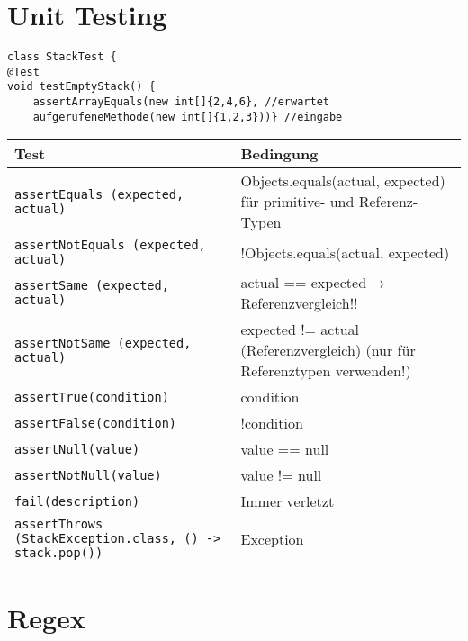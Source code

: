 \begin{multicols*}{5}
\section{Unit Testing}
\begin{lstlisting}
class StackTest {
@Test 
void testEmptyStack() {
	assertArrayEquals(new int[]{2,4,6}, //erwartet
	aufgerufeneMethode(new int[]{1,2,3}))} //eingabe
	\end{lstlisting}
	\begin{tabular}{|p{2cm} p{2.65cm}|}
		\hline
		Test&Bedingung\\
		\hline
		\hline
		\tiny\texttt{assertEquals (expected, actual)}&\footnotesize Objects.equals(actual, expected) für primitive- und Referenz-Typen\\
		\hline
		\tiny\texttt{assertNotEquals (expected, actual)}&\footnotesize !Objects.equals(actual, expected)\\
		\hline
		\tiny\texttt{assertSame (expected, actual)}&\footnotesize actual == expected\newline $\rightarrow$ Referenzvergleich!!\\
		\hline
		\tiny\texttt{assertNotSame (expected, actual)}&\footnotesize expected != actual (Referenzvergleich) (nur für Referenztypen verwenden!)\\
		\hline
		\tiny\texttt{assertTrue(condition)}&\footnotesize condition\\
		\hline
		\tiny\texttt{assertFalse(condition)}&\footnotesize !condition\\
		\hline
		\tiny\texttt{assertNull(value)}&\footnotesize value == null\\
		\hline
		\tiny\texttt{assertNotNull(value)}&\footnotesize value != null\\
		\hline
		\tiny\texttt{fail(description)}&\footnotesize Immer verletzt\\
		\hline
		\tiny\texttt{assertThrows (StackException.class, () -> stack.pop())}&\footnotesize Exception\\
		\hline
	\end{tabular}

\section{Regex}


\end{multicols*}
